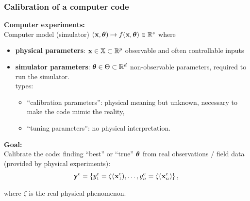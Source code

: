 \documentclass[nopagenumber,9pt]{beamer}
\begin{document}
\begin{frame}
\frametitle{Calibration of a computer code} 
 \textbf{Computer experiments:}
 \\
 \medskip
Computer model (simulator)  $(\mathbf{x},\boldsymbol{\theta})\mapsto f(\mathbf{x},\boldsymbol{\theta})\in \mathbb{R}^s $ where\\
\medskip
\begin{itemize}
  \item \textbf{physical parameters}: $\mathbf{x}\in  \mathbb{X}\subset\mathbb{R}^p$ observable and often controllable inputs
  \medskip
  \item \textbf{simulator parameters}: $\boldsymbol{\theta}\in \Theta\subset\mathbb{R}^d$ non-observable parameters, required to run the simulator.
  \\
   types:
  \begin{itemize}
   \item ``calibration parameters'': physical meaning but unknown, necessary to make the code mimic the reality,  
   \item ``tuning parameters'': no physical interpretation.
  \end{itemize}
\end{itemize}

  \bigskip
  
  \textbf{Goal:}\\
  Calibrate the code: finding ``best'' or ``true'' $\boldsymbol{\theta}$ from real observations / field data 
  (provided by physical experiments):
  $$\mathbf{y}^{e}=\{y^{e}_1=\zeta(\mathbf{x}^e_1),\ldots,y^{e}_n=\zeta(\mathbf{x}^e_n)\}\,,$$

  where $\zeta$ is the real physical phenomenon.
  
  \end{frame}

  
  
\end{document}
